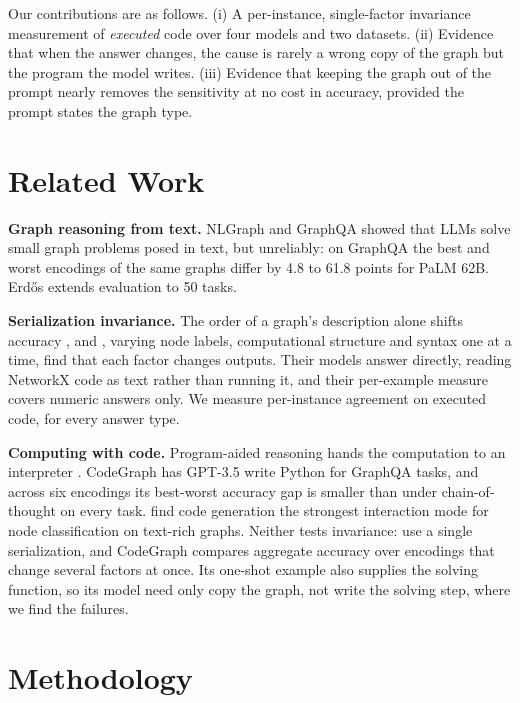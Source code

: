 \documentclass[11pt]{article}
\begin{document}
Our contributions are as follows. (i) A per-instance, single-factor invariance measurement of \emph{executed} code over four models and two datasets. (ii) Evidence that when the answer changes, the cause is rarely a wrong copy of the graph but the program the model writes. (iii) Evidence that keeping the graph out of the prompt nearly removes the sensitivity at no cost in accuracy, provided the prompt states the graph type.

\section{Related Work}

\textbf{Graph reasoning from text.} NLGraph \citep{wang} and GraphQA \citep{fatemi} showed that LLMs solve small graph problems posed in text, but unreliably: on GraphQA the best and worst encodings of the same graphs differ by 4.8 to 61.8 points for PaLM 62B. Erdős \citep{guo} extends evaluation to 50 tasks.

\textbf{Serialization invariance.} The order of a graph's description alone shifts accuracy \citep{ge}, and \citet{herbst}, varying node labels, computational structure and syntax one at a time, find that each factor changes outputs. Their models answer directly, reading NetworkX code as text rather than running it, and their per-example measure covers numeric answers only. We measure per-instance agreement on executed code, for every answer type.

\textbf{Computing with code.} Program-aided reasoning hands the computation to an interpreter \citep{gao}. CodeGraph \citep{cai} has GPT-3.5 write Python for GraphQA tasks, and across six encodings its best-worst accuracy gap is smaller than under chain-of-thought on every task. \citet{finkelshtein} find code generation the strongest interaction mode for node classification on text-rich graphs. Neither tests invariance: \citet{finkelshtein} use a single serialization, and CodeGraph compares aggregate accuracy over encodings that change several factors at once. Its one-shot example also supplies the solving function, so its model need only copy the graph, not write the solving step, where we find the failures.

\section{Methodology}
\end{document}
